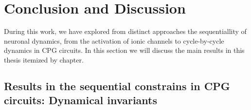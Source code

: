 \chapter{Conclusion and Discussion} %
\label{c-conclusion}

During this work, we have explored from distinct approaches the sequentiallity of neuronal dynamics, from the activation of ionic channels to cycle-by-cycle dynamics in CPG circuits. In this section we will discuss the main results in this thesis itemized by chapter. 


\section{Results in the sequential constrains in CPG circuits: Dynamical invariants}
